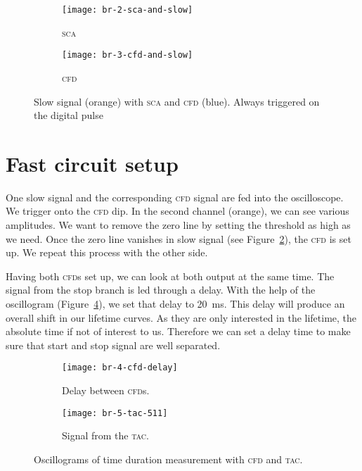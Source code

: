\documentclass[11pt, english, fleqn, DIV=15, headinclude, BCOR=2cm]{scrreprt}
\begin{document}
\begin{figure}
    \centering
    \begin{subfigure}[c]{0.48\linewidth}
        \centering
        \texttt{[image: br-2-sca-and-slow]}
        \caption{%
            \textsc{sca}
        }
        \label{fig:2-sca-and-slow}
    \end{subfigure}
    \hfill
    \begin{subfigure}[c]{0.48\linewidth}
        \centering
        \texttt{[image: br-3-cfd-and-slow]}
        \caption{%
            \textsc{cfd}
        }
        \label{fig:3-cfd-and-slow}
    \end{subfigure}
    \caption{%
        Slow signal (orange) with \textsc{sca} and \textsc{cfd} (blue). Always
        triggered on the digital pulse
    }
    \label{fig:}
\end{figure}

\section{Fast circuit setup}

One slow signal and the corresponding \textsc{cfd} signal are fed into the
oscilloscope. We trigger onto the \textsc{cfd} dip. In the second channel
(orange), we can see various amplitudes. We want to remove the zero line by
setting the threshold as high as we need. Once the zero line vanishes in slow
signal (see Figure~\ref{fig:3-cfd-and-slow}), the \textsc{cfd} is set up. We
repeat this process with the other side.

Having both \textsc{cfd}s set up, we can look at both output at the same time.
The signal from the stop branch is led through a delay. With the help of the
oscillogram (Figure~\ref{fig:4-cfd-delay}), we set that delay to
\SI{20}{\milli\second}. This delay will produce an overall shift in our
lifetime curves. As they are only interested in the lifetime, the absolute time
if not of interest to us. Therefore we can set a delay time to make sure that
start and stop signal are well separated.

\begin{figure}
    \centering
    \begin{subfigure}[c]{0.48\linewidth}
        \centering
        \texttt{[image: br-4-cfd-delay]}
        \caption{%
            Delay between \textsc{cfd}s.
        }
        \label{fig:4-cfd-delay}
    \end{subfigure}
    \hfill
    \begin{subfigure}[c]{0.48\linewidth}
        \centering
        \texttt{[image: br-5-tac-511]}
        \caption{%
            Signal from the \textsc{tac}.
        }
        \label{fig:5-tac-511}
    \end{subfigure}
    \caption{%
        Oscillograms of time duration measurement with \textsc{cfd} and
        \textsc{tac}.
    }
    \label{fig:}
\end{figure}
\end{document}
